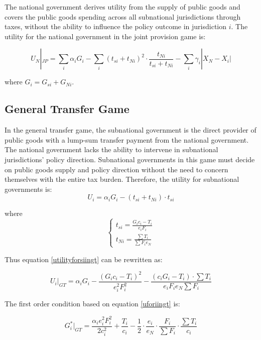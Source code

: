 The national government derives utility from the supply of public goods and covers the public goods spending across all subnational jurisdictions through taxes, without the ability to influence the policy outcome in jurisdiction $i$. The utility for the national government in the joint provision game is:%

\begin{equation}
    U_N|_{JP}= \sum_i \alpha_i G_i - \sum_i (t_{si}+t_{Ni})^2 \cdot \frac{t_{Ni}}{t_{si}+t_{Ni}}
    -\sum_i \gamma_i |X_N-X_i|
\end{equation}

where $G_i=G_{si}+G_{Ni}$.

\subsection{General Transfer Game}

In the general transfer game, the subnational government is the direct provider of public goods with a lump-sum transfer payment from the national government. The national government lacks the ability to intervene in subnational jurisdictions' policy direction. Subnational governments in this game must decide on public goods supply and policy direction without the need to concern themselves with the entire tax burden. Therefore, the utility for subnational governments is:
\begin{equation}
    U_i=\alpha_i G_i -(t_{si}+t_{Ni})\cdot t_{si}\label{utilityforsiingt}
\end{equation}

where
$$
    \left\{\begin{array}{l}
        t_{si}= \frac{G_i c_i-T_i}{e_i F_i} \\
        t_{Ni}=\frac{\sum T_i}{\sum F_i e_N}
    \end{array}\right.
$$

Thus equation \ref{utilityforsiingt} can be rewritten as:

\begin{equation}
    U_i|_{GT}=\alpha_i G_i- \frac{(G_i c_i-T_i)^2}{e_i^2 F_i^2}-\frac{(c_iG_i-T_i)\cdot \sum T_i}{e_i F_i e_N\sum F_i } \label{uforiingt}
\end{equation}

The first order condition based on equation \ref{uforiingt} is:

\begin{equation}
    G_i^*|_{GT}=\frac{\alpha_i e_i^2F_i^2}{2c_i^2}+\frac{T_i}{c_i}-\frac{1}{2}\cdot \frac{e_i}{e_N}\cdot \frac{F_i}{\sum F_i} \cdot \frac{\sum T_i}{c_i}\label{gofgeneral}
\end{equation}


